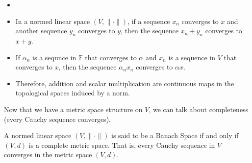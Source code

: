 \begin{recall}
    \begin{itemize}
        \item []
        \item In a normed linear space $(V,\|\cdot\|)$, if a sequence $x_{n}$ converges to $x$ and another sequence $y_{n}$ converges to $y$, then the sequence $x_{n}+y_{n}$ converges to $x+y$.
        \item If $\alpha_{n}$ is a sequnce in $\mathbb{F}$ that converges to $\alpha$ and $x_{n}$ is a sequence in $V$ that converges to $x$, then the sequence $\alpha_{n}x_{n}$ converges to $\alpha x$.
        \item Therefore, addition and scalar multiplication are continuous maps in the topological spaces induced by a norm.
    \end{itemize}
\end{recall}
\vspace{0.4cm}
\begin{motive}
    Now that we have a metric space structure on $V$, we can talk about completeness (every Cauchy sequence converges).
\end{motive}
\vspace{0.4cm}
\begin{definition}
    A normed linear space $(V,\|\cdot\|)$ is said to be a Banach Space if and only if $(V,d)$ is a complete metric space. That is, every Cauchy sequence in $V$ converges in the metric space $(V,d)$.
\end{definition}
\vspace{0.4cm}
